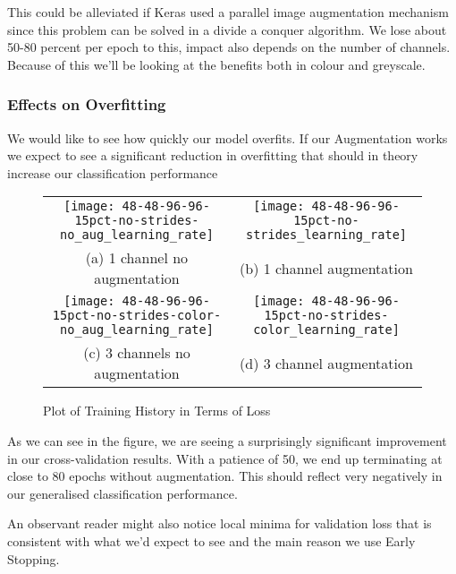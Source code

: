 This could be alleviated if Keras used a parallel image augmentation mechanism since this problem can be solved in a divide a conquer algorithm. We lose about 50-80 percent per epoch to this, impact also depends on the number of channels. Because of this we'll be looking at the benefits both in colour and greyscale.

\subsubsection{Effects on Overfitting}
We would like to see how quickly our model overfits. If our Augmentation works we expect to see a significant reduction in overfitting that should in theory increase our classification performance
\begin{figure}[h!]
	\begin{tabular}{cc}
		\texttt{[image: 48-48-96-96-15pct-no-strides-no\_aug\_learning\_rate]} &   \texttt{[image: 48-48-96-96-15pct-no-strides\_learning\_rate]} \\
		(a) 1 channel no augmentation & (b) 1 channel augmentation \\[6pt]
		\texttt{[image: 48-48-96-96-15pct-no-strides-color-no\_aug\_learning\_rate]} &   \texttt{[image: 48-48-96-96-15pct-no-strides-color\_learning\_rate]} \\
		(c) 3 channels no augmentation & (d) 3 channel augmentation \\[6pt]
	\end{tabular}
	\caption{Plot of Training History in Terms of Loss}
\end{figure}

As we can see in the figure, we are seeing a surprisingly significant improvement in our cross-validation results. With a patience of 50, we end up terminating at close to 80 epochs without augmentation. This should reflect very negatively in our generalised classification performance.

An observant reader might also notice local minima for validation loss that is consistent with what we'd expect to see and the main reason we use Early Stopping.
